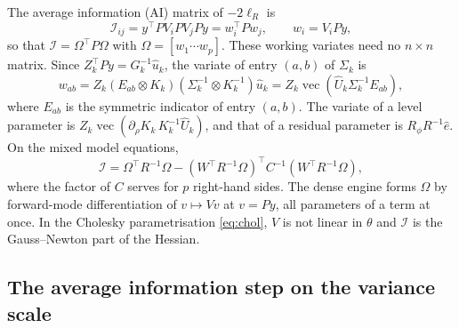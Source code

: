 \documentclass[article,nojss]{jss}
\newcommand{\vecop}{\operatorname{vec}}
\begin{document}
The average information (AI) matrix of $-2\ell_R$ is
\citep{gilmour1995,johnson1995}
\begin{equation}\label{eq:AI}
  \mathcal{I}_{ij} = y^\top P V_i P V_j P y = w_i^\top P w_j,
  \qquad w_i = V_i P y ,
\end{equation}
so that $\mathcal{I} = \Omega^\top P \Omega$ with
$\Omega = [w_1 \cdots w_p]$. These working variates need no $n \times n$
matrix. Since $Z_k^\top P y =
G_k^{-1}\hat u_k$, the variate of entry $(a,b)$ of $\Sigma_k$ is
\begin{equation}\label{eq:working}
  w_{ab} = Z_k (E_{ab} \otimes K_k)(\Sigma_k^{-1} \otimes K_k^{-1}) \hat u_k
  = Z_k \vecop\!\left(\hat U_k \Sigma_k^{-1} E_{ab}\right),
\end{equation}
where $E_{ab}$ is the symmetric indicator of entry $(a,b)$. The variate of a
level parameter is $Z_k \vecop(\partial_\rho K_k\, K_k^{-1} \hat U_k)$, and
that of a residual parameter is $R_\phi R^{-1}\hat e$. On the mixed model
equations,
\begin{equation}\label{eq:AIC}
  \mathcal{I} = \Omega^\top R^{-1} \Omega - (W^\top R^{-1}\Omega)^\top C^{-1}
  (W^\top R^{-1}\Omega),
\end{equation}
where the factor of $C$ serves for $p$ right-hand sides. The dense engine forms
$\Omega$ by forward-mode differentiation of $v \mapsto V v$ at $v = Py$, all
parameters of a term at once. In the Cholesky parametrisation
\eqref{eq:chol}, $V$ is not linear in $\theta$ and $\mathcal{I}$ is the
Gauss--Newton part of the Hessian.

\subsection{The average information step on the variance scale}\label{sec:aistep}
\end{document}
